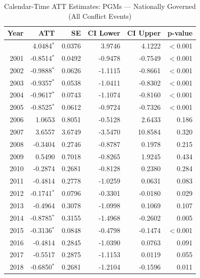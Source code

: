 \begin{longtable}{rrrrrr}
\caption{Calendar-Time ATT Estimates: PGMs --- Nationally Governed (All Conflict Events)} \label{tab:cal_pgms} \\
\toprule
\textbf{Year} & \textbf{ATT} & \textbf{SE} & \textbf{CI Lower} & \textbf{CI Upper} & \textbf{p-value} \\
\midrule
\endfirsthead
\bottomrule
\endlastfoot
2000 & 4.0484$^{*}$ & 0.0376 & 3.9746 & 4.1222 & $<$0.001 \\
2001 & -0.8514$^{*}$ & 0.0492 & -0.9478 & -0.7549 & $<$0.001 \\
2002 & -0.9888$^{*}$ & 0.0626 & -1.1115 & -0.8661 & $<$0.001 \\
2003 & -0.9357$^{*}$ & 0.0538 & -1.0411 & -0.8302 & $<$0.001 \\
2004 & -0.9617$^{*}$ & 0.0743 & -1.1074 & -0.8160 & $<$0.001 \\
2005 & -0.8525$^{*}$ & 0.0612 & -0.9724 & -0.7326 & $<$0.001 \\
2006 & 1.0653 & 0.8051 & -0.5128 & 2.6433 & 0.186 \\
2007 & 3.6557 & 3.6749 & -3.5470 & 10.8584 & 0.320 \\
2008 & -0.3404 & 0.2746 & -0.8787 & 0.1978 & 0.215 \\
2009 & 0.5490 & 0.7018 & -0.8265 & 1.9245 & 0.434 \\
2010 & -0.2874 & 0.2681 & -0.8128 & 0.2380 & 0.284 \\
2011 & -0.4814 & 0.2778 & -1.0259 & 0.0631 & 0.083 \\
2012 & -0.1741$^{*}$ & 0.0796 & -0.3301 & -0.0180 & 0.029 \\
2013 & -0.4964 & 0.3078 & -1.0998 & 0.1069 & 0.107 \\
2014 & -0.8785$^{*}$ & 0.3155 & -1.4968 & -0.2602 & 0.005 \\
2015 & -0.3136$^{*}$ & 0.0848 & -0.4798 & -0.1474 & $<$0.001 \\
2016 & -0.4814 & 0.2845 & -1.0390 & 0.0763 & 0.091 \\
2017 & -0.5517 & 0.2875 & -1.1153 & 0.0119 & 0.055 \\
2018 & -0.6850$^{*}$ & 0.2681 & -1.2104 & -0.1596 & 0.011 \\
\end{longtable}
